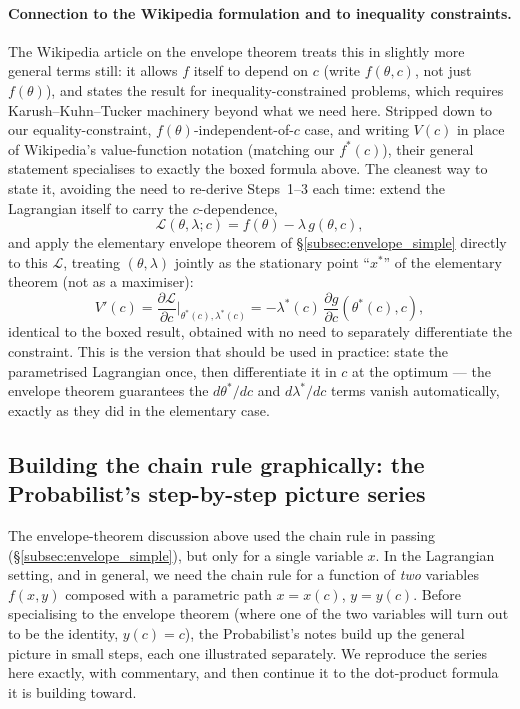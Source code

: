 \documentclass[a4paper,oneside,12pt]{extarticle}
\theoremstyle{plain}
\theoremstyle{definition}
\theoremstyle{remark}
\begin{document}
\paragraph{Connection to the Wikipedia formulation and to inequality
constraints.}
The Wikipedia article on the envelope theorem treats this in
slightly more general terms still: it allows $f$ itself to depend
on $c$ (write $f(\theta,c)$, not just $f(\theta)$), and states the
result for inequality-constrained problems, which requires
Karush--Kuhn--Tucker machinery beyond what we need here.  Stripped
down to our equality-constraint, $f(\theta)$-independent-of-$c$
case, and writing $V(c)$ in place of Wikipedia's value-function
notation (matching our $f^*(c)$), their general statement
specialises to exactly the boxed formula above.  The cleanest way
to state it, avoiding the need to re-derive Steps~1--3 each time:
extend the Lagrangian itself to carry the $c$-dependence,
\[
  \mathcal{L}(\theta,\lambda;c) = f(\theta) - \lambda\, g(\theta,c),
\]
and apply the elementary envelope theorem of
\S\ref{subsec:envelope_simple} directly to this $\mathcal{L}$,
treating $(\theta,\lambda)$ jointly as the stationary point ``$x^*$''
of the elementary theorem (not as a maximiser):
\[
  V'(c) = \frac{\partial\mathcal{L}}{\partial c}
  \bigg|_{\theta^*(c),\lambda^*(c)}
  = -\lambda^*(c)\,\frac{\partial g}{\partial c}(\theta^*(c),c),
\]
identical to the boxed result, obtained with no need to separately
differentiate the constraint.  This is the version that should be
used in practice: state the parametrised Lagrangian once, then
differentiate it in $c$ at the optimum --- the envelope theorem
guarantees the $d\theta^*/dc$ and $d\lambda^*/dc$ terms vanish
automatically, exactly as they did in the elementary case.

\subsection{Building the chain rule graphically: the Probabilist's step-by-step
picture series}
\label{subsec:envelope_chainrule_pictures}

The envelope-theorem discussion above used the chain rule in
passing (\S\ref{subsec:envelope_simple}), but only for a single
variable $x$.  In the Lagrangian setting, and in general, we need
the chain rule for a function of \emph{two} variables $f(x,y)$
composed with a parametric path $x=x(c)$, $y=y(c)$.  Before
specialising to the envelope theorem (where one of the two
variables will turn out to be the identity, $y(c)=c$), the Probabilist's
notes build up the general picture in small steps, each one
illustrated separately.  We reproduce the series here exactly,
with commentary, and then continue it to the dot-product formula
it is building toward.
\end{document}
